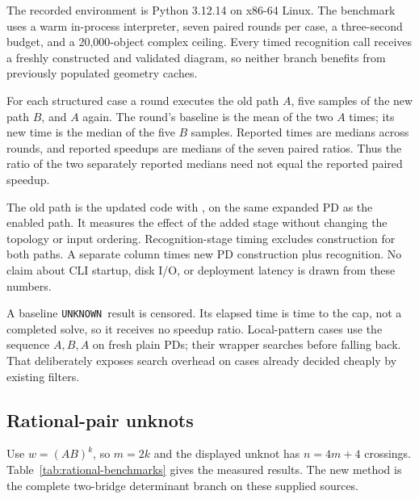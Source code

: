 \documentclass[11pt,a4paper]{article}
\theoremstyle{definition}
\theoremstyle{remark}
\newcommand{\unknown}{\texttt{UNKNOWN}}
\newcommand{\code}[1]{\texttt{\detokenize{#1}}}
\numberwithin{equation}{section}
\begin{document}
The recorded environment is Python 3.12.14 on x86-64 Linux. The benchmark
uses a warm in-process interpreter, seven paired rounds per case, a
three-second budget, and a 20,000-object complex ceiling. Every timed
recognition call receives a freshly constructed and validated diagram,
so neither branch benefits from previously populated geometry caches.

For each structured case a round executes the old path \(A\), five samples
of the new path \(B\), and \(A\) again. The round's baseline is the mean
of the two \(A\) times; its new time is the median of the five \(B\) samples.
Reported times are medians across rounds, and reported speedups are
medians of the seven paired ratios. Thus the ratio of the two separately
reported medians need not equal the reported paired speedup.

The old path is the updated code with \code{use_rational=False}, on the
same expanded PD as the enabled path. It measures the effect of the added
stage without changing the topology or input ordering. Recognition-stage
timing excludes construction for both paths. A separate column times
new PD construction plus recognition. No claim about CLI startup, disk
I/O, or deployment latency is drawn from these numbers.

A baseline \unknown\ result is censored. Its elapsed time is time to
the cap, not a completed solve, so it receives no speedup ratio.
Local-pattern cases use the sequence \(A,B,A\) on fresh plain PDs;
their wrapper searches before falling back. That deliberately exposes
search overhead on cases already decided cheaply by existing filters.

\subsection{Rational-pair unknots}

Use \(w=(AB)^k\), so \(m=2k\) and the displayed unknot has \(n=4m+4\)
crossings. Table~\ref{tab:rational-benchmarks} gives the measured results.
The new method is the complete two-bridge determinant branch on these
supplied sources.
\end{document}
